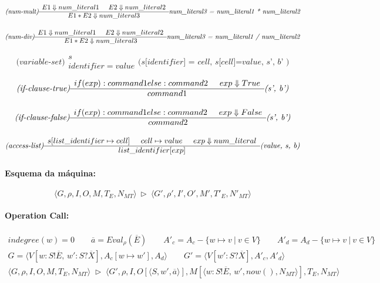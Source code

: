 \documentclass{llncs}
\newcommand{\tuple}[1]{\langle #1 \rangle}
\newcommand{\setof}[1]{\{ #1 \} }
\newcommand{\eval}[2]{\mathit{Eval}_{#1}(#2)}
\def\tr{\rhd}    %
\newcommand{\pfrule}[2]{\begin{array}{c} #1 \\ \hline #2 \end{array}}
\begin{document}
$$
\textit{(num-mult)}
\pfrule
{E1 \Downarrow num\_literal1 \hspace{5 mm} E2 \Downarrow num\_literal2}
{E1 * E2 \Downarrow num\_literal3}
\textit{num\_literal3 = num\_literal1 * num\_literal2}
$$


$$
\textit{(num-div)}
\pfrule
{E1 \Downarrow num\_literal1 \hspace{5 mm} E2 \Downarrow num\_literal2}
{E1 * E2 \Downarrow num\_literal3}
\textit{num\_literal3 = num\_literal1 / num\_literal2}
$$

$$
\textit{(variable-set)}
\pfrule
{s}
{identifier = value}
{\textit{(s[identifier] = cell, s[cell]=value,  s', b' )}}
$$

$$
\textit{(if-clause-true)}
\pfrule
{if (exp): command1 else: command2 \hspace{5 mm}  exp \Downarrow True}
{command1}
{\textit{(s', b')}}
$$

$$
\textit{(if-clause-false)}
\pfrule
{if (exp): command1 else: command2 \hspace{5 mm}  exp \Downarrow False}
{command2}
{\textit{(s', b')}}
$$


$$
\textit{(access-list)}
\pfrule
{s[list\_identifier \mapsto cell] \hspace{5 mm} cell \mapsto value \hspace{5 mm} exp \Downarrow num\_literal}
{list\_identifier[exp]}
{\textit{(value, s, b)}}
$$





\newpage
\paragraph{Esquema da máquina:}

$$\tuple{G, \rho, I, O, M, T_E, N_{MT}} \ \tr\ \tuple{G', \rho', I', O', M', T'_E, N'_{MT}}$$




\paragraph{Operation Call:}

$$
\pfrule{
\mathit{indegree}(w) = 0 \qquad 
\overline{a} = \eval{\rho}{\overline{E}} \qquad
A'_c = A_c - \setof{w\mapsto v \ | \ v \in V} \qquad
A'_d = A_d - \setof{w\mapsto v \ | \ v \in V} \\[1mm]
G = \tuple{V[w:S!\overline{E}, \, w' : S?\overline{X}], A_c[w \mapsto w'], A_d} \qquad
G' = \tuple{V[w' : S?\overline{X}], A'_c, A'_d}
}{
\tuple{G,\rho, I, O, M, T_E, N_{MT}}
\; \tr \;
\tuple{G',\rho, I, O[\tuple{S, w', \overline{a}}], M[\tuple{w:S!\overline{E}, \, w', \mathit{now()}, N_{MT}}], T_E, N_{MT}}
}
$$
\end{document}
